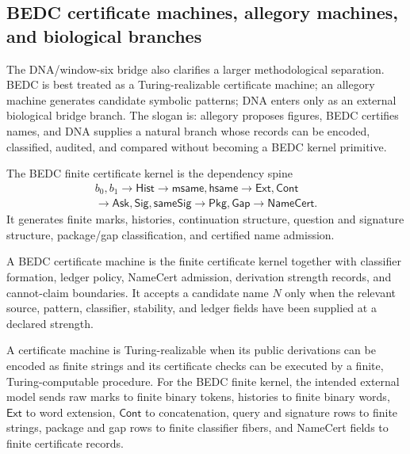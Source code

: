 \subsection{BEDC certificate machines, allegory machines, and biological branches}
\label{subsec:philosophy-certificate-machine-allegory-branch}

The DNA/window-six bridge also clarifies a larger methodological
separation. BEDC is best treated as a Turing-realizable certificate
machine; an allegory machine generates candidate symbolic patterns; DNA
enters only as an external biological bridge branch. The slogan is:
allegory proposes figures, BEDC certifies names, and DNA supplies a
natural branch whose records can be encoded, classified, audited, and
compared without becoming a BEDC kernel primitive.

\begin{definition}
\label{def:philosophy-bedc-finite-certificate-kernel}
The BEDC finite certificate kernel is the dependency spine
$$
\begin{gathered}
  b_{0},b_{1}
  \to \mathsf{Hist}
  \to \mathsf{msame},\mathsf{hsame}
  \to \mathsf{Ext},\mathsf{Cont}\\
  \to \mathsf{Ask},\mathsf{Sig},\mathsf{sameSig}
  \to \mathsf{Pkg},\mathsf{Gap}
  \to \mathsf{NameCert}.
\end{gathered}
$$
It generates finite marks, histories, continuation structure, question
and signature structure, package/gap classification, and certified name
admission.
\end{definition}

\begin{definition}
\label{def:philosophy-bedc-certificate-machine}
A BEDC certificate machine is the finite certificate kernel together
with classifier formation, ledger policy, NameCert admission, derivation
strength records, and cannot-claim boundaries. It accepts a candidate
name $N$ only when the relevant source, pattern, classifier, stability,
and ledger fields have been supplied at a declared strength.
\end{definition}

\begin{definition}
\label{def:philosophy-turing-realizable-certificate-machine}
A certificate machine is Turing-realizable when its public derivations
can be encoded as finite strings and its certificate checks can be
executed by a finite, Turing-computable procedure. For the BEDC finite
kernel, the intended external model sends raw marks to finite binary
tokens, histories to finite binary words, $\mathsf{Ext}$ to word
extension, $\mathsf{Cont}$ to concatenation, query and signature rows to
finite strings, package and gap rows to finite classifier fibers, and
NameCert fields to finite certificate records.
\end{definition}

